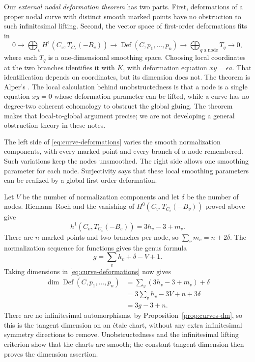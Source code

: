 Our \emph{external nodal deformation theorem} has two parts.
First, deformations of a proper nodal curve with distinct smooth
marked points have no obstruction to such infinitesimal lifting.
Second, the vector space of first-order deformations fits in
\begin{equation}\label{eq:curve-deformations}
 0\longrightarrow
 \bigoplus_v H^1(C_v,T_{C_v}(-B_v))
 \longrightarrow \operatorname{Def}(C,p_1,\ldots,p_n)
 \longrightarrow \bigoplus_{q\text{ a node}} T_q
 \longrightarrow0,
\end{equation}
where each $T_q$ is a one-dimensional smoothing space.
Choosing local coordinates at the two branches identifies it
with $K$, with deformation equation $xy=\epsilon a$.
That identification depends on coordinates, but its dimension
does not. The theorem is Alper's
\cite[Propositions 6.3.26 and 6.3.28, pp.~232--235]{Alper}.
The local calculation behind unobstructedness is that a node is
a single equation $xy=0$ whose deformation parameter can be
lifted, while a curve has no degree-two coherent cohomology to
obstruct the global gluing. The theorem makes that local-to-global
argument precise; we are not developing a general obstruction
theory in these notes.

The left side of \eqref{eq:curve-deformations} varies the smooth
normalization components, with every marked point and every
branch of a node remembered. Such variations keep the nodes
unsmoothed. The right side allows one smoothing parameter for
each node. Surjectivity says that these local smoothing parameters
can be realized by a global first-order deformation.

Let $V$ be the number of normalization components and let
$\delta$ be the number of nodes. Riemann--Roch and the vanishing
of $H^0(C_v,T_{C_v}(-B_v))$ proved above give
\[
 h^1(C_v,T_{C_v}(-B_v))=3h_v-3+m_v.
\]
There are $n$ marked points and two branches per node, so
$\sum_vm_v=n+2\delta$. The normalization sequence for functions
gives the genus formula
\[
                  g=\sum_vh_v+\delta-V+1.
\]
Taking dimensions in \eqref{eq:curve-deformations} now gives
\begin{align*}
 \dim\operatorname{Def}(C,p_1,\ldots,p_n)
 &=\sum_v(3h_v-3+m_v)+\delta\\
 &=3\sum_vh_v-3V+n+3\delta\\
 &=3g-3+n.
\end{align*}
There are no infinitesimal automorphisms, by
Proposition~\ref{prop:curves-dm}, so this is the tangent dimension
on an \'etale chart, without any extra infinitesimal symmetry
directions to remove. Unobstructedness and the infinitesimal
lifting criterion show that the charts are smooth; the constant
tangent dimension then proves the dimension assertion.

